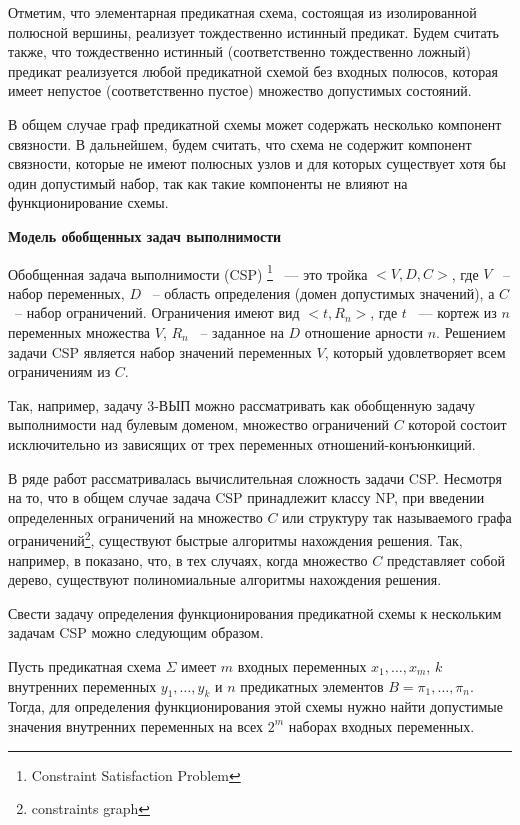\documentclass[12pt]{article}
\newenvironment{definition}[1][Определение]{\begin{trivlist}
\item[\hskip \labelsep {\bfseries #1}]}{\end{trivlist}}
\begin{document}
Отметим, что элементарная предикатная схема, состоящая из изолированной полюсной вершины, 
реализует тождественно истинный предикат.
 Будем считать также, что тождественно истинный (соответственно тождественно ложный)
 предикат реализуется любой предикатной схемой без входных полюсов, 
которая имеет непустое (соответственно пустое) множество допустимых состояний.

В общем случае граф предикатной схемы может содержать несколько компонент связности. 
В дальнейшем, будем считать, что схема не содержит компонент связности, 
которые не имеют полюсных узлов и для которых существует хотя бы один допустимый набор, так как такие компоненты не влияют на функционирование схемы.

\textbf{Модель обобщенных задач выполнимости}

\begin{definition}
Обобщенная задача выполнимости (CSP) \footnote{Constraint Satisfaction Problem} 
~--- это тройка $<V,D,C>$, где $V$ ~-- набор переменных, $D$ ~-- область определения (домен допустимых значений), 
а $C$ ~-- набор ограничений. Ограничения имеют вид $<t, R_n>$, где $t$ ~--- кортеж из $n$ переменных множества $V$, 
$R_n$ ~-- заданное на $D$ отношение арности $n$. 
Решением задачи CSP является набор значений переменных $V$, который удовлетворяет всем ограничениям из $C$. 
\end{definition}

Так, например, задачу 3-ВЫП можно рассматривать как обобщенную задачу выполнимости над булевым доменом, множество
ограничений $C$ которой состоит исключительно из зависящих от трех переменных отношений-конъюнкиций.

В ряде работ рассматривалась вычислительная сложность задачи CSP. Несмотря на то, что в общем случае задача CSP
принадлежит классу NP, при введении определенных ограничений на множество $C$ или структуру так называемого
графа ограничений\footnote{constraints graph}, существуют быстрые алгоритмы нахождения решения. 
Так, например, в \cite{Shaeffer78} показано, 
что, в тех случаях, когда множество $C$ представляет собой дерево, существуют полиномиальные алгоритмы нахождения решения.

Свести задачу определения функционирования предикатной схемы к нескольким задачам CSP можно следующим образом.

Пусть предикатная схема $\Sigma$ имеет $m$ входных переменных $x_1, \ldots , x_m$, 
$k$ внутренних переменных $y_1, \ldots , y_k$ и $n$ предикатных элементов $B = \pi_1, \dots , \pi_n$. 
Тогда, для определения функционирования этой схемы нужно найти допустимые значения внутренних переменных на всех $2^{m}$
наборах входных переменных. 
\end{document}
